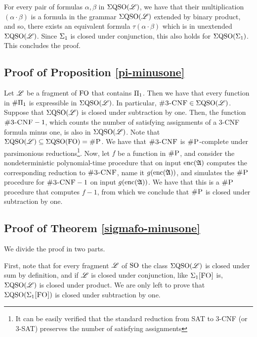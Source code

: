 For every pair of formulas $\alpha,\beta$ in $\Sigma{\rm QSO}(\mathscr{L})$, we have that their multiplication $(\alpha\cdot\beta)$ is a formula in the grammar $\Sigma{\rm QSO}(\mathscr{L})$ extended by binary product, and so, there exists an equivalent formula $\tau(\alpha\cdot\beta)$ which is in unextended $\Sigma{\rm QSO}(\mathscr{L})$. Since $\Sigma_{1}$ is closed under conjunction, this also holds for $\Sigma{\rm QSO}(\Sigma_{1})$. This concludes the proof.










\subsection*{Proof of Proposition \ref{pi-minusone}}

Let $\mathscr{L}$ be a fragment of ${\rm FO}$ that contains $\Pi_{1}$. Then we have that every function in $\#\Pi_{1}$ is expressible in $\Sigma{\rm QSO}(\mathscr{L})$. In particular, $\ctcnf \in \eqso(\LL)$. Suppose that $\Sigma{\rm QSO}(\mathscr{L})$ is closed under subtraction by one. Then, the function $\ctcnf-1$, which counts the number of satisfying assignments of a 3-CNF formula minus one, is also in $\Sigma{\rm QSO}(\mathscr{L})$. Note that $\Sigma{\rm QSO}(\mathscr{L}) \subseteq \Sigma{\rm QSO}({\rm FO}) = \text{\sc \#P}$. We have that $\ctcnf$ is $\text{\sc \#P}$-complete under parsimonious reductions\footnote{It can be easily verified that the standard reduction from SAT to 3-CNF (or 3-SAT) preserves the number of satisfying assignments}. Now, let $f$ be a function in $\text{\sc \#P}$, and consider the nondeterministic polynomial-time procedure that on input ${\rm enc}(\mathfrak{A})$ computes the corresponding reduction to $\ctcnf$, name it $g({\rm enc}(\mathfrak{A}))$, and simulates the $\text{\sc \#P}$ procedure for $\ctcnf-1$ on input $g({\rm enc}(\mathfrak{A}))$. We have that this is a $\text{\sc \#P}$ procedure that computes $f-1$, from which we conclude that $\text{\sc \#P}$ is closed under subtraction by one.










\subsection*{Proof of Theorem \ref{sigmafo-minusone}}

We divide the proof in two parts.

\vspace{1em}
First, note that for every fragment $\mathscr{L}$ of ${\rm SO}$ the class $\Sigma{\rm QSO}(\mathscr{L})$ is closed under sum by definition, and if $\mathscr{L}$ is closed under conjunction, like $\Sigma_{1}\textsc{[FO]}$ is, $\Sigma{\rm QSO}(\mathscr{L})$ is closed under product. We are only left to prove that $\Sigma{\rm QSO}(\Sigma_{1}\textsc{[FO]})$ is closed under subtraction by one.

